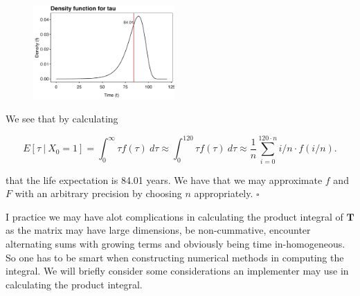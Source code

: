 \documentclass[
]{book}
\begin{document}
\begin{figure}[H]
  \begin{center}
    \includegraphics[width=0.48\textwidth]{figures/ex1_PT_dist.png}
  \end{center}
\end{figure}

We see that by calculating

\[
E[\tau\ \vert\ X_0=1]=\int_0^\infty \tau f(\tau)\ d\tau\approx\int_0^{120}\tau f(\tau)\ d\tau\approx\frac{1}{n}\sum_{i=0}^{120\cdot n} i/n\cdot f(i/n).
\]

that the life expectation is 84.01 years. We have that we may approximate \(f\) and \(F\) with an arbitrary precision by choosing \(n\) appropriately. \(\square\)

I practice we may have alot complications in calculating the product integral of \(\mathbf T\) as the matrix may have large dimensions, be non-cummative, encounter alternating sums with growing terms and obviously being time in-homogeneous. So one has to be smart when constructing numerical methods in computing the integral. We will briefly consider some considerations an implementer may use in calculating the product integral.
\end{document}
